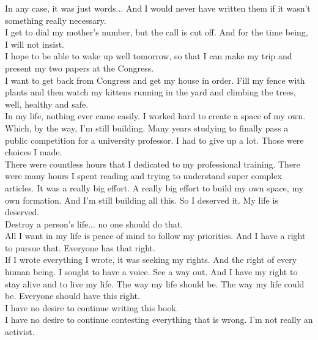 \documentclass[11pt]{book}
\begin{document}
\noindent In any case, it was just words... And I would never have written them if it wasn't something really necessary. \\

\noindent I get to dial my mother's number, but the call is cut off. And for the time being, I will not insist. \\

\noindent I hope to be able to wake up well tomorrow, so that I can make my trip and present my two papers at the Congress. \\

\noindent I want to get back from Congress and get my house in order. Fill my fence with plants and then watch my kittens running in the yard and climbing the trees, well, healthy and safe. \\

\noindent In my life, nothing ever came easily. I worked hard to create a space of my own. Which, by the way, I'm still building. Many years studying to finally pass a public competition for a university professor. I had to give up a lot. Those were choices I made. \\ 

\noindent There were countless hours that I dedicated to my professional training. There were many hours I spent reading and trying to understand super complex articles. It was a really big effort. A really big effort to build my own space, my own formation. And I'm still building all this. So I deserved it. My life is deserved. \\ 

\noindent Destroy a person's life... no one should do that. \\

\noindent All I want in my life is peace of mind to follow my priorities. And I have a right to pursue that. Everyone has that right. \\

\noindent If I wrote everything I wrote, it was seeking my rights. And the right of every human being. I sought to have a voice. See a way out. And I have my right to stay alive and to live my life. The way my life should be. The way my life could be. Everyone should have this right. \\

\noindent I have no desire to continue writing this book. \\

\noindent I have no desire to continue contesting everything that is wrong. I'm not really an activist. \\
\end{document}
